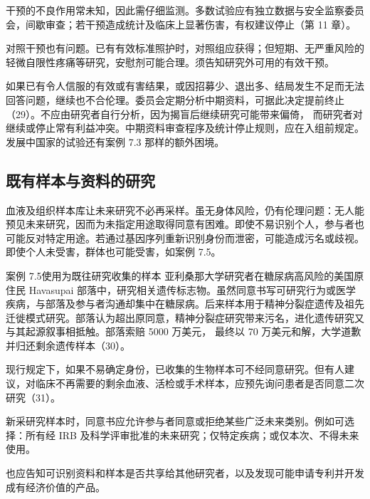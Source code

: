 干预的不良作用常未知，因此需仔细监测。多数试验应有独立数据与安全监察委员会，间歇审查；若干预造成统计及临床上显著伤害，有权建议停止（第 11 章）。

对照干预也有问题。已有有效标准照护时，对照组应获得；但短期、无严重风险的轻微自限性疼痛等研究，安慰剂可能合理。须告知研究外可用的有效干预。

如果已有令人信服的有效或有害结果，或因招募少、退出多、结局发生不足而无法回答问题，继续也不合伦理。委员会定期分析中期资料，可据此决定提前终止（29）。不应由研究者自行分析，因为揭盲后继续研究可能带来偏倚，
而研究者对继续或停止常有利益冲突。中期资料审查程序及统计停止规则，应在入组前规定。发展中国家的试验还有案例 7.3 那样的额外困境。

\subsection{既有样本与资料的研究}
血液及组织样本库让未来研究不必再采样。虽无身体风险，仍有伦理问题：无人能预见未来研究，因而为未指定用途取得同意有困难。即使不易识别个人，参与者也可能反对特定用途。若通过基因序列重新识别身份而泄密，可能造成污名或歧视。即使个人未受害，群体也可能受害，如案例 7.5。
\begin{bookbox}{案例 7.5\quad 使用为既往研究收集的样本}
亚利桑那大学研究者在糖尿病高风险的美国原住民 Havasupai 部落中，研究相关遗传标志物。虽然同意书写可研究行为或医学疾病，与部落及参与者沟通却集中在糖尿病。后来样本用于精神分裂症遗传及祖先迁徙模式研究。部落认为超出原同意，精神分裂症研究带来污名，进化遗传研究又与其起源叙事相抵触。部落索赔 5000 万美元，
最终以 70 万美元和解，大学道歉并归还剩余遗传样本（30）。
\end{bookbox}
现行规定下，如果不易确定身份，已收集的生物样本可不经同意研究。但有人建议，对临床不再需要的剩余血液、活检或手术样本，应预先询问患者是否同意二次研究（31）。

新采研究样本时，同意书应允许参与者同意或拒绝某些广泛未来类别。例如可选择：所有经 IRB 及科学评审批准的未来研究；仅特定疾病；或仅本次、不得未来使用。

也应告知可识别资料和样本是否共享给其他研究者，以及发现可能申请专利并开发成有经济价值的产品。

